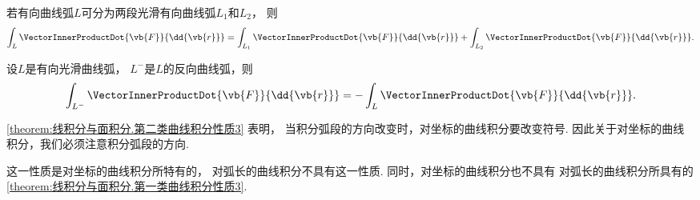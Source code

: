 \begin{property}\label{theorem:线积分与面积分.第二类曲线积分性质2}
若有向曲线弧\(L\)可分为两段光滑有向曲线弧\(L_1\)和\(L_2\)，
则\begin{equation*}
	\int_L \VectorInnerProductDot{\vb{F}}{\dd{\vb{r}}}
	= \int_{L_1} \VectorInnerProductDot{\vb{F}}{\dd{\vb{r}}}
	+ \int_{L_2} \VectorInnerProductDot{\vb{F}}{\dd{\vb{r}}}.
\end{equation*}
\end{property}

\begin{property}\label{theorem:线积分与面积分.第二类曲线积分性质3}
设\(L\)是有向光滑曲线弧，
\(L^-\)是\(L\)的反向曲线弧，则\begin{equation*}
	\int_{L^-} \VectorInnerProductDot{\vb{F}}{\dd{\vb{r}}}
	= - \int_L \VectorInnerProductDot{\vb{F}}{\dd{\vb{r}}}.
\end{equation*}
\end{property}
\cref{theorem:线积分与面积分.第二类曲线积分性质3} 表明，
当积分弧段的方向改变时，对坐标的曲线积分要改变符号.
因此关于对坐标的曲线积分，我们必须注意积分弧段的方向.

这一性质是对坐标的曲线积分所特有的，
对弧长的曲线积分不具有这一性质.
同时，对坐标的曲线积分也不具有
对弧长的曲线积分所具有的\cref{theorem:线积分与面积分.第一类曲线积分性质3}.

